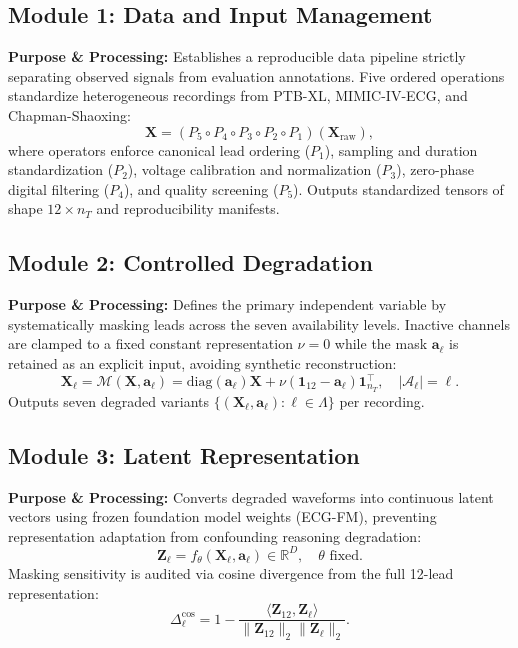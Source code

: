 \documentclass{ssnreview}
\begin{document}
\subsection{Module 1: Data and Input Management}
\textbf{Purpose \& Processing:} Establishes a reproducible data pipeline strictly separating
observed signals from evaluation annotations. Five ordered operations standardize heterogeneous
recordings from PTB-XL, MIMIC-IV-ECG, and Chapman-Shaoxing:
\begin{equation}
  \mathbf{X} = (P_5 \circ P_4 \circ P_3 \circ P_2 \circ P_1)(\mathbf{X}_{\mathrm{raw}}),
\end{equation}
where operators enforce canonical lead ordering ($P_1$), sampling and duration standardization
($P_2$), voltage calibration and normalization ($P_3$), zero-phase digital filtering ($P_4$),
and quality screening ($P_5$). Outputs standardized tensors of shape $12 \times n_T$ and
reproducibility manifests.

\subsection{Module 2: Controlled Degradation}
\textbf{Purpose \& Processing:} Defines the primary independent variable by systematically
masking leads across the seven availability levels. Inactive channels are clamped to a fixed
constant representation $\nu = 0$ while the mask $\mathbf{a}_\ell$ is retained as an explicit
input, avoiding synthetic reconstruction:
\begin{equation}
  \mathbf{X}_\ell = \mathcal{M}(\mathbf{X}, \mathbf{a}_\ell) = \mathrm{diag}(\mathbf{a}_\ell)\mathbf{X} + \nu(\mathbf{1}_{12} - \mathbf{a}_\ell)\mathbf{1}_{n_T}^\top, \quad |\mathcal{A}_\ell| = \ell.
\end{equation}
Outputs seven degraded variants $\{(\mathbf{X}_\ell, \mathbf{a}_\ell) : \ell \in \Lambda\}$ per recording.

\subsection{Module 3: Latent Representation}
\textbf{Purpose \& Processing:} Converts degraded waveforms into continuous latent vectors using
frozen foundation model weights (ECG-FM), preventing representation adaptation from
confounding reasoning degradation:
\begin{equation}
  \mathbf{Z}_\ell = f_\theta(\mathbf{X}_\ell, \mathbf{a}_\ell) \in \mathbb{R}^D, \quad \theta \text{ fixed}.
\end{equation}
Masking sensitivity is audited via cosine divergence from the full 12-lead representation:
\begin{equation}
  \Delta_\ell^{\cos} = 1 - \frac{\langle\mathbf{Z}_{12},\mathbf{Z}_\ell\rangle}{\|\mathbf{Z}_{12}\|_2\|\mathbf{Z}_\ell\|_2}.
\end{equation}
\end{document}

